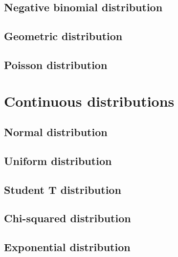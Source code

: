 \documentclass[english,10pt,a4paper,oneside]{book}
\begin{document}
\hypertarget{negative-binomial-distribution}{%
\subsection{Negative binomial distribution}\label{negative-binomial-distribution}}

\hypertarget{geometric-distribution}{%
\subsection{Geometric distribution}\label{geometric-distribution}}

\hypertarget{poisson-distribution}{%
\subsection{Poisson distribution}\label{poisson-distribution}}

\hypertarget{continuous-distributions}{%
\section{Continuous distributions}\label{continuous-distributions}}

\hypertarget{normal-distribution}{%
\subsection{Normal distribution}\label{normal-distribution}}

\hypertarget{uniform-distribution}{%
\subsection{Uniform distribution}\label{uniform-distribution}}

\hypertarget{student-t-distribution}{%
\subsection{Student T distribution}\label{student-t-distribution}}

\hypertarget{chi-squared-distribution}{%
\subsection{Chi-squared distribution}\label{chi-squared-distribution}}

\hypertarget{exponential-distribution}{%
\subsection{Exponential distribution}\label{exponential-distribution}}
\end{document}
